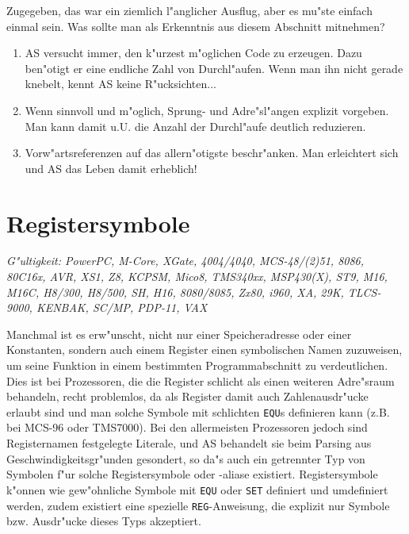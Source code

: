 \documentclass[12pt,a4paper,twoside]{report}
\makeatletter
\newcommand{\tty}[1]{{\tt #1}}
\newcommand{\ttindex}[1]{\index{#1@{\tt #1}}}
\newcommand{\asname}{AS}
\makeatother
\begin{document}
Zugegeben, das war ein ziemlich l"anglicher Ausflug, aber es mu"ste einfach
einmal sein.  Was sollte man als Erkenntnis aus diesem Abschnitt mitnehmen?
\begin{enumerate}
\item{\asname{} versucht immer, den k"urzest m"oglichen Code zu erzeugen.  Dazu
      ben"otigt er eine endliche Zahl von Durchl"aufen.  Wenn man ihn
      nicht gerade knebelt, kennt \asname{} keine R"ucksichten...}
\item{Wenn sinnvoll und m"oglich, Sprung- und Adre"sl"angen explizit
      vorgeben.  Man kann damit u.U. die Anzahl der Durchl"aufe deutlich
      reduzieren.}
\item{Vorw"artsreferenzen auf das allern"otigste beschr"anken.  Man
      erleichtert sich und \asname{} das Leben damit erheblich!}
\end{enumerate}


\section{Registersymbole}
\label{SectRegSyms} \ttindex{Registersymbole}

{\em G"ultigkeit: PowerPC, M-Core, XGate, 4004/4040, MCS-48/(2)51, 8086,
     80C16x, AVR, XS1, Z8, KCPSM, Mico8, TMS340xx, MSP430(X), ST9, M16,
     M16C, H8/300, H8/500, SH, H16, 8080/8085, Zx80, i960, XA, 29K,
     TLCS-9000, KENBAK, SC/MP, PDP-11, VAX}

Manchmal ist es erw"unscht, nicht nur einer Speicheradresse oder einer
Konstanten, sondern auch einem Register einen symbolischen Namen zuzuweisen,
um seine Funktion in einem bestimmten Programmabschnitt zu verdeutlichen.
Dies ist bei Prozessoren, die die Register schlicht als einen weiteren
Adre"sraum behandeln, recht problemlos, da als Register damit auch
Zahlenausdr"ucke erlaubt sind und man solche Symbole mit schlichten
\tty{EQU}s definieren kann (z.B. bei MCS-96 oder TMS7000).  Bei den
allermeisten Prozessoren jedoch sind Registernamen festgelegte Literale, und
\asname{} behandelt sie beim Parsing aus Geschwindigkeitsgr"unden gesondert, so da"s auch
ein getrennter Typ von Symbolen f"ur solche Registersymbole oder -aliase existiert.
Registersymbole k"onnen wie gew"ohnliche Symbole mit \tty{EQU} oder \tty{SET}
definiert und umdefiniert werden, zudem existiert eine spezielle \tty{REG}-Anweisung,
die explizit nur Symbole bzw. Ausdr"ucke dieses Typs akzeptiert.
\end{document}
